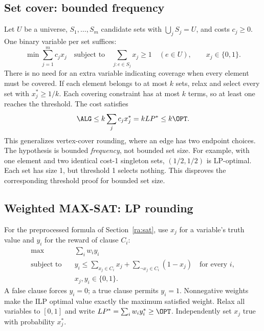 \subsection{Set cover: bounded frequency}\label{lp:cover}
Let $U$ be a universe, $S_1,\ldots,S_m$ candidate sets with
$\bigcup_jS_j=U$, and costs $c_j\ge0$. One binary variable per set suffices:
\[
  \min\sum_{j=1}^m c_jx_j
  \quad\text{subject to}\quad
  \sum_{j:e\in S_j}x_j\ge1\quad(e\in U),\qquad x_j\in\{0,1\}.
\]
There is no need for an extra variable indicating coverage when every
element must be covered. If each element belongs to at most $k$ sets,
relax and select every set with $x_j^*\ge1/k$. Each covering constraint has
at most $k$ terms, so at least one reaches the threshold. The cost satisfies
\[
  \ALG\le k\sum_jc_jx_j^*=kLP^*\le k\OPT.
\]
This generalizes vertex-cover rounding, where an edge has two endpoint
choices. The hypothesis is bounded \emph{frequency}, not bounded set size.
For example, with one element and two identical cost-1 singleton sets,
$(1/2,1/2)$ is LP-optimal. Each set has size 1, but threshold 1 selects
nothing. This disproves the corresponding threshold proof for bounded set
size.

\subsection{Weighted MAX-SAT: LP rounding}\label{lp:sat}
For the preprocessed formula of Section~\ref{ra:sat}, use $x_j$ for a
variable's truth value and $y_i$ for the reward of clause $C_i$:
\[
  \begin{aligned}
    \max\quad &\sum_iw_i y_i\\
    \text{subject to}\quad &
      y_i\le\sum_{x_j\in C_i}x_j+
             \sum_{\neg x_j\in C_i}(1-x_j)\quad\text{for every }i,\\
    &x_j,y_i\in\{0,1\}.
  \end{aligned}
\]
A false clause forces $y_i=0$; a true clause permits $y_i=1$.
Nonnegative weights make the ILP optimal value exactly the maximum
satisfied weight. Relax all variables to $[0,1]$ and write
$LP^*=\sum_iw_i y_i^*\ge\OPT$.
Independently set $x_j$ true with probability $x_j^*$.

